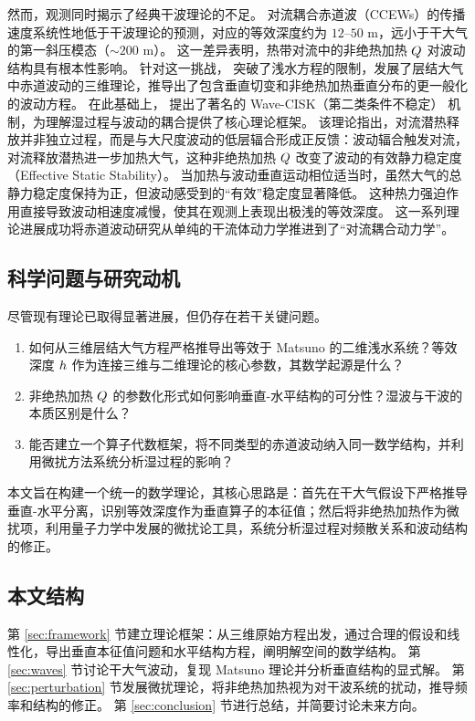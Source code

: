 然而，观测同时揭示了经典干波理论的不足。
对流耦合赤道波（CCEWs）的传播速度系统性地低于干波理论的预测，对应的等效深度约为 $12$--$50$ m，远小于干大气的第一斜压模态（$\sim 200$ m）。
这一差异表明，热带对流中的非绝热加热 $Q$ 对波动结构具有根本性影响。
针对这一挑战，\citep{hayashiTheoryLargeScaleEquatorial1970} 突破了浅水方程的限制，发展了层结大气中赤道波动的三维理论，推导出了包含垂直切变和非绝热加热垂直分布的更一般化的波动方程。
在此基础上，\citep{lindzenWaveCISKTropics1974} 提出了著名的 Wave-CISK（第二类条件不稳定） 机制，为理解湿过程与波动的耦合提供了核心理论框架。
该理论指出，对流潜热释放并非独立过程，而是与大尺度波动的低层辐合形成正反馈：波动辐合触发对流，对流释放潜热进一步加热大气，这种非绝热加热 $Q$ 改变了波动的有效静力稳定度（Effective Static Stability）。
当加热与波动垂直运动相位适当时，虽然大气的总静力稳定度保持为正，但波动感受到的“有效”稳定度显著降低。
这种热力强迫作用直接导致波动相速度减慢，使其在观测上表现出极浅的等效深度。
这一系列理论进展成功将赤道波动研究从单纯的干流体动力学推进到了“对流耦合动力学”。

\subsection{科学问题与研究动机}

尽管现有理论已取得显著进展，但仍存在若干关键问题。

\begin{enumerate}
    \item 如何从三维层结大气方程严格推导出等效于 Matsuno 的二维浅水系统？等效深度 $h$ 作为连接三维与二维理论的核心参数，其数学起源是什么？

    \item 非绝热加热 $Q$ 的参数化形式如何影响垂直-水平结构的可分性？湿波与干波的本质区别是什么？

    \item 能否建立一个算子代数框架，将不同类型的赤道波动纳入同一数学结构，并利用微扰方法系统分析湿过程的影响？
\end{enumerate}

本文旨在构建一个统一的数学理论，其核心思路是：首先在干大气假设下严格推导垂直-水平分离，识别等效深度作为垂直算子的本征值；然后将非绝热加热作为微扰项，利用量子力学中发展的微扰论工具，系统分析湿过程对频散关系和波动结构的修正。

\subsection{本文结构}

第 \ref{sec:framework} 节建立理论框架：从三维原始方程出发，通过合理的假设和线性化，导出垂直本征值问题和水平结构方程，阐明解空间的数学结构。
第 \ref{sec:waves} 节讨论干大气波动，复现 Matsuno 理论并分析垂直结构的显式解。
第 \ref{sec:perturbation} 节发展微扰理论，将非绝热加热视为对干波系统的扰动，推导频率和结构的修正。
第 \ref{sec:conclusion} 节进行总结，并简要讨论未来方向。
